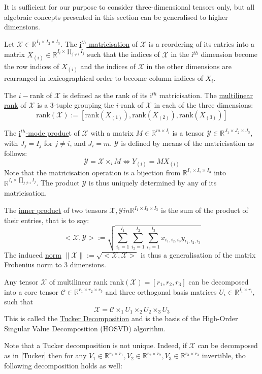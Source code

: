 \documentclass[a4paper, 11pt]{article} %
\def \be {\begin{equation*}}
\def \ee {\end{equation*}}
\def \bee {\begin{equation}}
\def \eee {\end{equation}}
\def \X {\mathcal{X}}
\def \R {\mathbb{R}}
\def \t {\times}
\def \rank{\mbox{rank}}
\def \Y {\mathcal{Y}}
\def \C {\mathcal{C}}
\begin{document}
It is sufficient for our purpose to consider three-dimensional tensors only, but all algebraic concepts presented in this section can be generalised to higher dimensions.

Let $\X \in \R^{I_1\t I_2 \t I_3}$.
The \underline{i$^{th}$ matricisation} of $\X$ is a reordering of its entries into a matrix $X_{(i)} \in \R^{ I_i\t \prod_{j\neq i}I_j}$ such that the indices of $\X$ in the i$^{th}$ dimension become the row indices of $X_{(i)}$ and the indices of $\X$ in the other dimensions are rearranged in lexicographical order to become column indices of $X_{i}$. 

The $i-$rank of $\X$ is defined as the rank of its i$^{th}$ matricisation. The \underline{multilinear rank} of $\X$ is a 3-tuple grouping the $i$-rank of $\X$ in each of the three dimensions:
\be
\rank(\X):=\left[\rank(X_{(1)}),  \rank(X_{(2)}), \rank(X_{(3)})\right]
\ee

The \underline{i$^{th}$-mode produc}t of $\X$ with a matrix $M \in \R^{m\t I_i}$ is a tensor $\mathcal{Y} \in \R^{J_1\t J_2\t J_3}$, with $J_j=I_j$ for $j\neq i$, and $J_i=m$. $\mathcal{Y}$ is defined by means of the matricisation as follows:
\be
\mathcal{Y}=\X \t_{i} M \iff Y_{(i)}=MX_{(i)}
\ee
Note that the matricisation operation is a bijection from $ \R^{I_1\t I_2 \t I_3}$ into $\R^{ I_i\t \prod_{j\neq i}I_j}$. The product $\mathcal{Y}$ is thus uniquely determined by any of its matricisation.

The \underline{inner product} of two tensors $\X, \Y in \R^{I_1\t I_2 \t I_3}$ is the sum of the product of their entries, that is to say:
\be
<\X,\Y>:=\sqrt{\sum\limits_{i_1=1}^{I_1}\sum\limits_{i_2=1}^{I_2}\sum\limits_{i_3=1}^{I_3} x_{i_1,i_2,i_3}y_{i_1,i_2,i_3}}
\ee 
The induced \underline{norm} $\|\X\|:=\sqrt{<\X, \X>}$ is thus a generalisation of the matrix Frobenius norm to 3 dimensions.

Any tensor $\X$ of multilinear rank $\rank(\X)=[r_1, r_2, r_3]$ can be decomposed into a core tensor $\C \in \R^{r_1\t r_2 \t r_3}$ and three orthogonal basis matrices $U_i \in \R^{I_i\t r_i}$, such that
\bee
\X=\C \t_1 U_1 \t_2 U_2 \t_3 U_3 
\label{Tucker}
\eee
This is called the \underline{Tucker Decomposition} and is the basis of the {High-Order Singular Value Decomposition} (HOSVD) algorithm. 

Note that a Tucker decomposition is not unique. Indeed, if $\X$ can be decomposed as in \autoref{Tucker} then for any $V_1\in \R^{r_1\times r_1}, V_2\in \R^{r_2\times r_2}, V_3\in \R^{r_3\times r_3}$ invertible, tho following decomposition holds as well:
\end{document}
